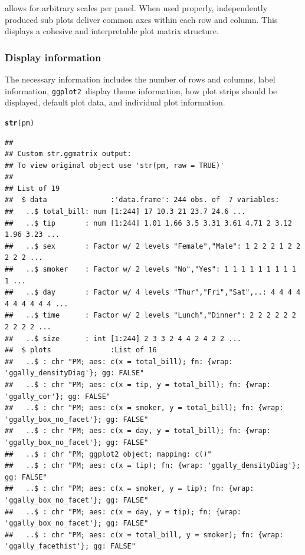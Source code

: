 \documentclass[stat,dissertation]{puthesis}\usepackage[]{graphicx}\usepackage{xcolor}
\makeatletter
\newcommand{\hlstd}[1]{\textcolor[rgb]{0.345,0.345,0.345}{#1}}%
\newcommand{\hlkwd}[1]{\textcolor[rgb]{0.737,0.353,0.396}{\textbf{#1}}}%
\newenvironment{kframe}{%
 \def\at@end@of@kframe{}%
 \ifinner\ifhmode%
  \def\at@end@of@kframe{\end{minipage}}%
  \begin{minipage}{\columnwidth}%
 \fi\fi%
 \def\FrameCommand##1{\hskip\@totalleftmargin \hskip-\fboxsep
 \colorbox{shadecolor}{##1}\hskip-\fboxsep
     \hskip-\linewidth \hskip-\@totalleftmargin \hskip\columnwidth}%
 \MakeFramed {\advance\hsize-\width
   \@totalleftmargin\z@ \linewidth\hsize
   \@setminipage}}%
 {\par\unskip\endMakeFramed%
 \at@end@of@kframe}
\newenvironment{knitrout}{}{} %
\renewenvironment{knitrout}{\setstretch{1}}{}
\newcommand{\pkg}[1]{\texttt{#1}}
\newcommand{\ggplot}{\pkg{ggplot2}}
\makeatother
\begin{document}
 allows for arbitrary scales per panel. When used properly, independently produced sub plots deliver common axes within each row and column.  This displays a cohesive and interpretable plot matrix structure.


\subsubsection{Display information}

The necessary information includes the number of rows and columns, label information, \ggplot~display theme information,  how plot strips should be displayed, default plot data, and individual plot information.

\begin{knitrout}\scriptsize
{}\color{fgcolor}\begin{kframe}
\begin{alltt}
\hlkwd{str}\hlstd{(pm)}
\end{alltt}
\begin{verbatim}
## 
## Custom str.ggmatrix output: 
## To view original object use 'str(pm, raw = TRUE)'
## 
## List of 19
##  $ data               :'data.frame':	244 obs. of  7 variables:
##   ..$ total_bill: num [1:244] 17 10.3 21 23.7 24.6 ...
##   ..$ tip       : num [1:244] 1.01 1.66 3.5 3.31 3.61 4.71 2 3.12 1.96 3.23 ...
##   ..$ sex       : Factor w/ 2 levels "Female","Male": 1 2 2 2 1 2 2 2 2 2 ...
##   ..$ smoker    : Factor w/ 2 levels "No","Yes": 1 1 1 1 1 1 1 1 1 1 ...
##   ..$ day       : Factor w/ 4 levels "Thur","Fri","Sat",..: 4 4 4 4 4 4 4 4 4 4 ...
##   ..$ time      : Factor w/ 2 levels "Lunch","Dinner": 2 2 2 2 2 2 2 2 2 2 ...
##   ..$ size      : int [1:244] 2 3 3 2 4 4 2 4 2 2 ...
##  $ plots              :List of 16
##   ..$ : chr "PM; aes: c(x = total_bill); fn: {wrap: 'ggally_densityDiag'}; gg: FALSE"
##   ..$ : chr "PM; aes: c(x = tip, y = total_bill); fn: {wrap: 'ggally_cor'}; gg: FALSE"
##   ..$ : chr "PM; aes: c(x = smoker, y = total_bill); fn: {wrap: 'ggally_box_no_facet'}; gg: FALSE"
##   ..$ : chr "PM; aes: c(x = day, y = total_bill); fn: {wrap: 'ggally_box_no_facet'}; gg: FALSE"
##   ..$ : chr "PM; ggplot2 object; mapping: c()"
##   ..$ : chr "PM; aes: c(x = tip); fn: {wrap: 'ggally_densityDiag'}; gg: FALSE"
##   ..$ : chr "PM; aes: c(x = smoker, y = tip); fn: {wrap: 'ggally_box_no_facet'}; gg: FALSE"
##   ..$ : chr "PM; aes: c(x = day, y = tip); fn: {wrap: 'ggally_box_no_facet'}; gg: FALSE"
##   ..$ : chr "PM; aes: c(x = total_bill, y = smoker); fn: {wrap: 'ggally_facethist'}; gg: FALSE"

\end{verbatim}
\end{kframe}
\end{knitrout}
\end{document}
